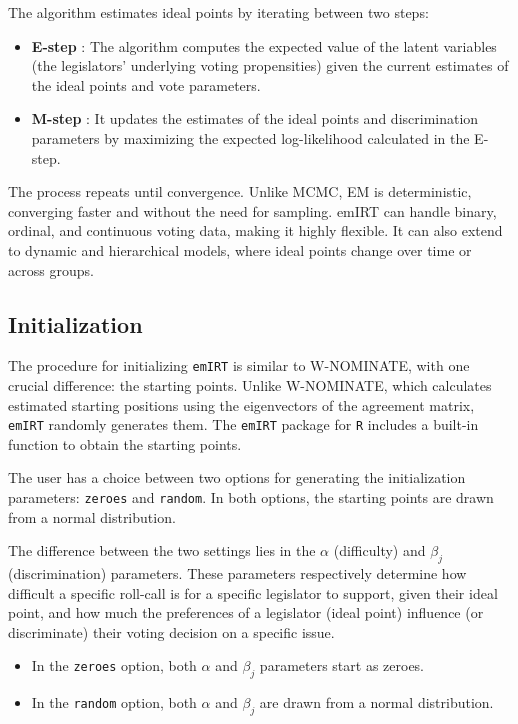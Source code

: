 \documentclass[a4paper,12pt]{report}
\begin{document}
    The algorithm estimates ideal points by
    iterating between two steps:
    \begin{itemize}
        \item \textbf{E-step}
        : The algorithm computes the expected value of the latent variables (the legislators' underlying
        voting propensities) given the current estimates of the ideal points and vote parameters.
        \item \textbf{M-step}
        : It updates the estimates of the ideal points and discrimination parameters by maximizing the
        expected log-likelihood calculated in the E-step.
    \end{itemize}
    The process repeats until convergence. Unlike MCMC, EM is deterministic, converging faster and without
    the need for sampling. emIRT can handle binary, ordinal, and continuous voting data, making it highly
    flexible. It can also extend to dynamic and hierarchical models, where ideal points change over
    time or across groups.

    \subsection{Initialization}

    The procedure for initializing \texttt{emIRT}
    is similar to W-NOMINATE, with one crucial difference: the starting points. Unlike W-NOMINATE, which calculates
    estimated starting positions using the eigenvectors of the agreement matrix, \texttt{emIRT}
    randomly generates them. The \texttt{emIRT} package for \texttt{R}
    includes a built-in function to obtain the starting points.

    The user has a choice between two options for generating the initialization parameters: \texttt{zeroes} and
    \texttt{random}. In both options, the starting points are drawn from a normal distribution.

    The difference between the two settings lies in the \(\alpha\) (difficulty) and \(\beta_j\)
    (discrimination) parameters. These parameters respectively determine how difficult a specific roll-call is for a
    specific legislator to support, given their ideal point, and how much the preferences of a legislator (ideal point)
    influence (or discriminate) their voting decision on a specific issue.

    \begin{itemize}
        \item In the \texttt{zeroes} option, both \(\alpha\) and \(\beta_j\) parameters start as zeroes.
        \item In the \texttt{random} option, both \(\alpha\) and \(\beta_j\) are drawn from a normal distribution.
    \end{itemize}
\end{document}
